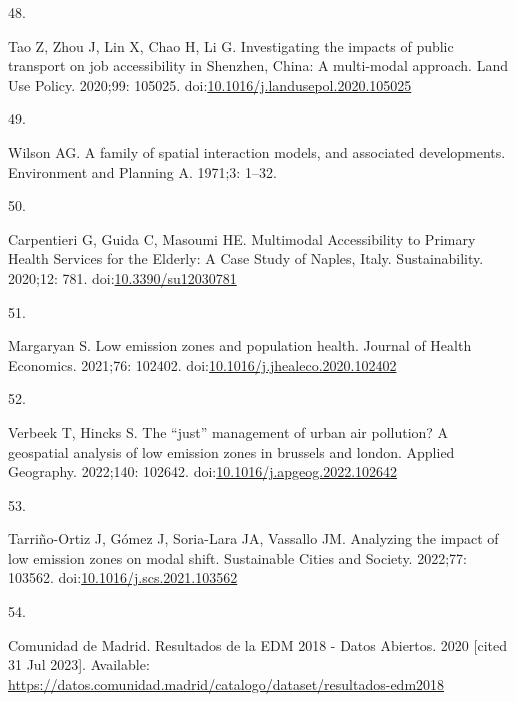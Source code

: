 \documentclass[10pt,letterpaper]{article}
\newlength{\cslhangindent}
\newlength{\csllabelwidth}
\newlength{\cslentryspacingunit} %
\newenvironment{CSLReferences}[2] %
 {%
  \setlength{\parindent}{0pt}
  \ifodd #1
  \let\oldpar\par
  \def\par{\hangindent=\cslhangindent\oldpar}
  \fi
  \setlength{\parskip}{#2\cslentryspacingunit}
 }%
 {}
\newcommand{\CSLLeftMargin}[1]{\parbox[t]{\csllabelwidth}{#1}}
\newcommand{\CSLRightInline}[1]{\parbox[t]{\linewidth - \csllabelwidth}{#1}\break}
\begin{document}
\begin{CSLReferences}{0}{0}
\leavevmode{}%
\CSLLeftMargin{48. }%
\CSLRightInline{Tao Z, Zhou J, Lin X, Chao H, Li G. Investigating the
impacts of public transport on job accessibility in {Shenzhen}, {China}:
A multi-modal approach. Land Use Policy. 2020;99: 105025.
doi:\href{https://doi.org/10.1016/j.landusepol.2020.105025}{10.1016/j.landusepol.2020.105025}}

\leavevmode{}%
\CSLLeftMargin{49. }%
\CSLRightInline{Wilson AG. A family of spatial interaction models, and
associated developments. Environment and Planning A. 1971;3: 1--32. }

\leavevmode{}%
\CSLLeftMargin{50. }%
\CSLRightInline{Carpentieri G, Guida C, Masoumi HE. Multimodal
{Accessibility} to {Primary Health Services} for the {Elderly}: {A Case
Study} of {Naples}, {Italy}. Sustainability. 2020;12: 781.
doi:\href{https://doi.org/10.3390/su12030781}{10.3390/su12030781}}

\leavevmode{}%
\CSLLeftMargin{51. }%
\CSLRightInline{Margaryan S. Low emission zones and population health.
Journal of Health Economics. 2021;76: 102402.
doi:\href{https://doi.org/10.1016/j.jhealeco.2020.102402}{10.1016/j.jhealeco.2020.102402}}

\leavevmode{}%
\CSLLeftMargin{52. }%
\CSLRightInline{Verbeek T, Hincks S. The {``just''} management of urban
air pollution? A geospatial analysis of low emission zones in brussels
and london. Applied Geography. 2022;140: 102642.
doi:\href{https://doi.org/10.1016/j.apgeog.2022.102642}{10.1016/j.apgeog.2022.102642}}

\leavevmode{}%
\CSLLeftMargin{53. }%
\CSLRightInline{Tarriño-Ortiz J, Gómez J, Soria-Lara JA, Vassallo JM.
Analyzing the impact of low emission zones on modal shift. Sustainable
Cities and Society. 2022;77: 103562.
doi:\href{https://doi.org/10.1016/j.scs.2021.103562}{10.1016/j.scs.2021.103562}}

\leavevmode{}%
\CSLLeftMargin{54. }%
\CSLRightInline{Comunidad de Madrid. Resultados de la {EDM} 2018 - Datos
Abiertos. 2020 {[}cited 31 Jul 2023{]}. Available:
\url{https://datos.comunidad.madrid/catalogo/dataset/resultados-edm2018}}


\end{CSLReferences}
\end{document}
